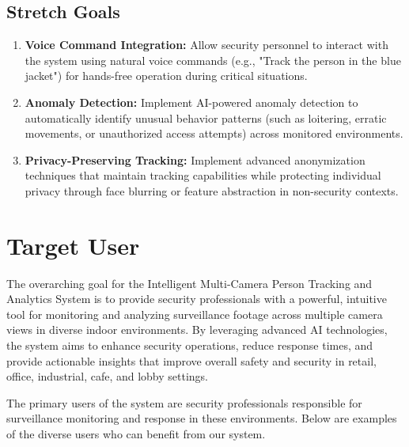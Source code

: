 \subsection{Stretch Goals}
\label{subsection:stretch-goals}

\begin{enumerate}[leftmargin=80pt]
    \item \textbf{Voice Command Integration:} Allow security personnel to interact with the system using natural voice commands (e.g., "Track the person in the blue jacket") for hands-free operation during critical situations.
    
    \item \textbf{Anomaly Detection:} Implement AI-powered anomaly detection to automatically identify unusual behavior patterns (such as loitering, erratic movements, or unauthorized access attempts) across monitored environments.
    
    \item \textbf{Privacy-Preserving Tracking:} Implement advanced anonymization techniques that maintain tracking capabilities while protecting individual privacy through face blurring or feature abstraction in non-security contexts.
    
\end{enumerate}

\section{Target User}
\label{section:target-user}

The overarching goal for the Intelligent Multi-Camera Person Tracking and Analytics System is to provide security professionals
with a powerful, intuitive tool for monitoring and analyzing surveillance footage across multiple camera views in diverse indoor environments.
By leveraging advanced AI technologies, the system aims to enhance security operations, reduce response times,
and provide actionable insights that improve overall safety and security in retail, office, industrial, cafe, and lobby settings.

The primary users of the system are security professionals responsible for surveillance monitoring and response in these environments.
Below are examples of the diverse users who can benefit from our system.

